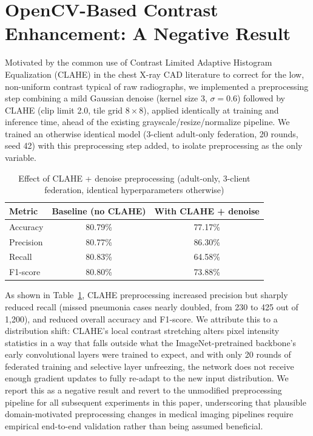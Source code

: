\documentclass[conference]{IEEEtran}
\begin{document}
\section{OpenCV-Based Contrast Enhancement: A Negative Result}
\label{sec:clahe}

Motivated by the common use of Contrast Limited Adaptive Histogram
Equalization (CLAHE) in the chest X-ray CAD literature to correct for the
low, non-uniform contrast typical of raw radiographs, we implemented a
preprocessing step combining a mild Gaussian denoise (kernel size 3,
$\sigma=0.6$) followed by CLAHE (clip limit 2.0, tile grid $8\times8$),
applied identically at training and inference time, ahead of the existing
grayscale/resize/normalize pipeline. We trained an otherwise identical model
(3-client adult-only federation, 20 rounds, seed 42) with this preprocessing
step added, to isolate preprocessing as the only variable.

\begin{table}[htbp]
\caption{Effect of CLAHE + denoise preprocessing (adult-only, 3-client
federation, identical hyperparameters otherwise)}
\begin{center}
\begin{tabular}{lcc}
\toprule
\textbf{Metric} & \textbf{Baseline (no CLAHE)} & \textbf{With CLAHE + denoise} \\
\midrule
Accuracy  & 80.79\% & 77.17\% \\
Precision & 80.77\% & 86.30\% \\
Recall    & 80.83\% & 64.58\% \\
F1-score  & 80.80\% & 73.88\% \\
\bottomrule
\end{tabular}
\label{tab:clahe}
\end{center}
\end{table}

As shown in Table~\ref{tab:clahe}, CLAHE preprocessing increased precision
but sharply reduced recall (missed pneumonia cases nearly doubled, from 230
to 425 out of 1{,}200), and reduced overall accuracy and F1-score. We
attribute this to a distribution shift: CLAHE's local contrast stretching
alters pixel intensity statistics in a way that falls outside what the
ImageNet-pretrained backbone's early convolutional layers were trained to
expect, and with only 20 rounds of federated training and selective
layer unfreezing, the network does not receive enough gradient updates to
fully re-adapt to the new input distribution. We report this as a negative
result and revert to the unmodified preprocessing pipeline for all
subsequent experiments in this paper, underscoring that plausible
domain-motivated preprocessing changes in medical imaging pipelines require
empirical end-to-end validation rather than being assumed beneficial.
\end{document}
